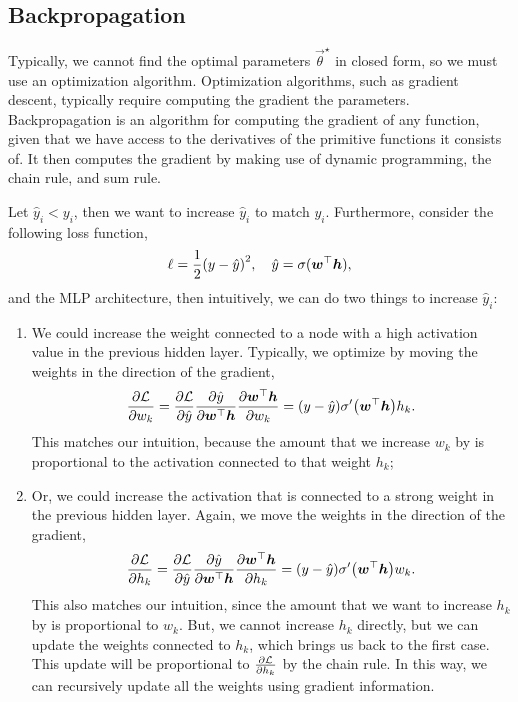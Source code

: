 \subsection{Backpropagation}

Typically, we cannot find the optimal parameters $\vec{\theta}^\star$ in closed form, so we must
use an optimization algorithm. Optimization algorithms, such as gradient descent, typically require
computing the gradient \wrt the parameters. Backpropagation is an algorithm for computing the
gradient of any function, given that we have access to the derivatives of the primitive functions
it consists of. It
then computes the gradient by making use of dynamic programming, the chain rule, and sum rule.

Let $\hat{y}_i < y_i$, then we want to increase $\hat{y}_i$ to match $y_i$. Furthermore, consider
the following loss function, \[
    \ell = \frac{1}{2} \lft( y - \hat{y} \rgt)^2, \quad \hat{y} = \sigma(\transpose{\vec{w}} \vec{h}),
\]
and the MLP architecture, then intuitively, we can do two things to increase $\hat{y}_i$:
\begin{enumerate}
    \item We could increase the weight connected to a node with a high activation value in the previous
          hidden layer. Typically, we optimize by moving the weights in the direction of the gradient, \[
              \pdv{\mathcal{L}}{w_k} = \pdv{\mathcal{L}}{\hat{y}} \pdv{\hat{y}}{\transpose{\vec{w}} \vec{h}} \pdv{\transpose{\vec{w}} \vec{h}}{w_k} = (y - \hat{y}) \sigma'\lft(\transpose{\vec{w}} \vec{h} \rgt) h_k.
          \]
          This matches our intuition, because the amount that we increase $w_k$ by is proportional to the
          activation connected to that weight $h_k$;

    \item Or, we could increase the activation that is connected to a strong weight in the previous hidden
          layer. Again, we move the weights in the direction of the gradient, \[
              \pdv{\mathcal{L}}{h_k} = \pdv{\mathcal{L}}{\hat{y}} \pdv{\hat{y}}{\transpose{\vec{w}} \vec{h}} \pdv{\transpose{\vec{w}} \vec{h}}{h_k} = (y - \hat{y}) \sigma' \lft( \transpose{\vec{w}} \vec{h} \rgt) w_k.
          \]
          This also matches our intuition, since the amount that we want to increase $h_k$ by is proportional
          to $w_k$. But, we cannot increase $h_k$ directly, but we can update the weights connected to $h_k$,
          which brings us back to the first case. This update will be proportional to
          $\pdv{\mathcal{L}}{h_k}$ by the chain rule. In this way, we can recursively update all the weights
          using gradient information.

\end{enumerate}

